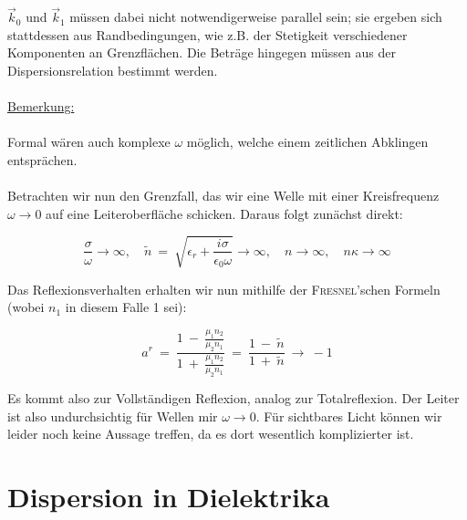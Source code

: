 $\vec{k}_0$ und $\vec{k}_1$ müssen dabei nicht notwendigerweise parallel sein; sie ergeben sich stattdessen aus Randbedingungen, wie z.B. der Stetigkeit verschiedener Komponenten an Grenzflächen. Die Beträge hingegen müssen aus der Dispersionsrelation bestimmt werden.
\ \\
\ \\
\underline{Bemerkung:}\\
\ \\
Formal wären auch komplexe $\omega$ möglich, welche einem zeitlichen Abklingen entsprächen.
\ \\
\ \\
Betrachten wir nun den Grenzfall, das wir eine Welle mit einer Kreisfrequenz $\omega \rightarrow 0$ auf eine Leiteroberfläche schicken. Daraus folgt zunächst direkt:

\begin{equation*}
\frac{\sigma}{\omega} \rightarrow \infty, \quad \tilde{n} \ = \ \sqrt{\epsilon_r + \frac{i\sigma}{\epsilon_0 \omega}}\rightarrow\infty, \quad n\rightarrow\infty,\quad n\kappa\rightarrow\infty
\end{equation*}

Das Reflexionsverhalten erhalten wir nun mithilfe der \textsc{Fresnel}'schen Formeln (wobei $n_1$ in diesem Falle 1 sei):

\begin{equation*}
a^r  \ = \  \frac{1 \ - \ \frac{\mu_1 n_2}{\mu_2 n_1}}{1 \ + \ \frac{\mu_1 n_2}{\mu_2 n_1}} \ = \ \frac{1 \ - \ \tilde{n}}{1\ + \ \tilde{n}} \ \rightarrow\  -1
\end{equation*}

Es kommt also zur Vollständigen Reflexion, analog zur Totalreflexion. Der Leiter ist also undurchsichtig für Wellen mir $\omega \rightarrow 0$. Für sichtbares Licht können wir leider noch keine Aussage treffen, da es dort wesentlich komplizierter ist.

\section{Dispersion in Dielektrika}